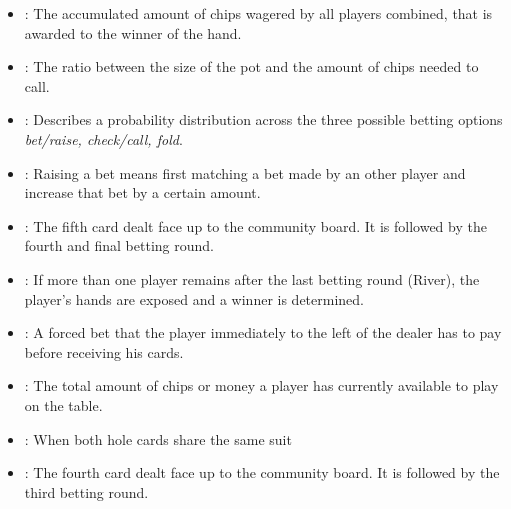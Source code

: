 \begin{appendices}
\begin{itemize}
\item {}:
The accumulated amount of chips wagered by all players combined, that is awarded to the winner of the hand.
\item {}:
The ratio between the size of the pot and the amount of chips needed to call.
\item {}:
Describes a probability distribution across the three possible betting options \textit{bet/raise, check/call, fold}.
\item {}:
Raising a bet means first matching a bet made by an other player and increase that bet by a certain amount.
\item {}: The fifth card dealt face up to the community board. It is followed by the fourth and final betting round.
\item {}:
If more than one player remains after the last betting round (River), the player's hands are exposed and a winner is determined.
\item {}:
A forced bet that the player immediately to the left of the dealer has to pay before receiving his cards.
\item {}:
The total amount of chips or money a player has currently available to play on the table.
\item {}:
When both hole cards share the same suit
\item {}: The fourth card dealt face up to the community board. It  is followed by the third betting round. 
\end{itemize}
\end{appendices}




